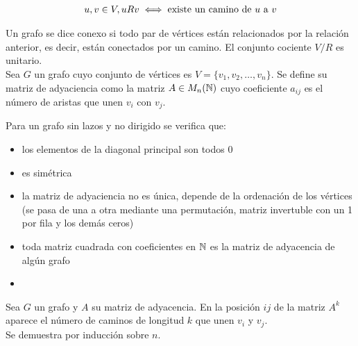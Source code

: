 \begin{align*}
    u,v\in V, uRv \iff \text{existe un camino de $u$ a $v$}
\end{align*}

Un grafo se dice conexo si todo par de vértices están relacionados por la relación anterior, es decir, están conectados por un camino. El conjunto cociente $V/R$ es unitario.\\

Sea $G$ un grafo cuyo conjunto de vértices es $V=\{v_1,v_2,\dots,v_n\}$. Se define su matriz de adyaciencia como la matriz $A\in M_n(\mathbb{N})$ cuyo coeficiente $a_{ij}$ es el número de aristas que unen $v_i$ con $v_j$.

\begin{propiedades}
    Para un grafo sin lazos y no dirigido se verifica que:
    \begin{itemize}
        \item los elementos de la diagonal principal son todos 0
        \item es simétrica
        \item la matriz de adyaciencia no es única, depende de la ordenación de los vértices (se pasa de una a otra mediante una permutación, matriz invertuble con un 1 por fila y los demás ceros)
        \item toda matriz cuadrada con coeficientes en $\mathbb{N}$ es la matriz de adyacencia de algún grafo
        \item %
    \end{itemize}
\end{propiedades}

\begin{teo}
    Sea $G$ un grafo y $A$ su matriz de adyacencia. En la posición $ij$ de la matriz $A^k$ aparece el número de caminos de longitud $k$ que unen $v_i$ y $v_j$.\\

    Se demuestra por inducción sobre $n$.
\end{teo}


